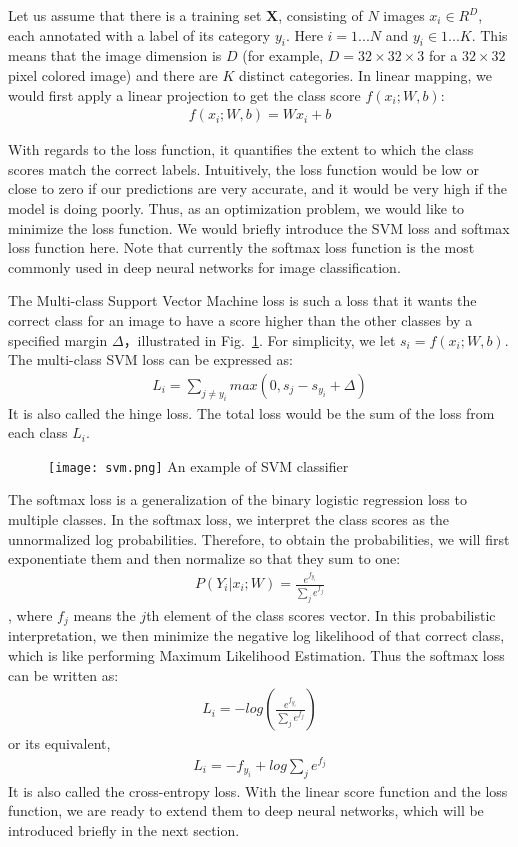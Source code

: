 Let us assume that there is a training set $\mathbf{X}$, consisting of $N$ images $x_i \in R^D$, each annotated with a label of its category $y_i$. Here $i = 1 ...N$ and $y_i \in 1 ... K$. This means that the image dimension is $D$ (for example, $D=32\times32\times3$ for a $32\times32$ pixel colored image) and there are $K$ distinct categories. In linear mapping, we would first apply a linear projection to get the class score $f(x_i; W, b)$:
\begin{align}
f(x_i; W, b) = Wx_i + b
\end{align}

With regards to the loss function, it quantifies the extent to which the class scores match the correct labels. Intuitively, the loss function would be low or close to zero if our predictions are very accurate, and it would be very high if the model is doing poorly. Thus, as an optimization problem, we would like to minimize the loss function. We would briefly introduce the SVM loss and softmax loss function here. Note that currently the softmax loss function is the most commonly used in deep neural networks for image classification.

The Multi-class Support Vector Machine loss is such a loss that it wants the correct class for an image to have a score higher than the other classes by a specified margin $\Delta$，illustrated in Fig.~\ref{fig:svm}. For simplicity, we let $s_i = f(x_i; W, b)$. The multi-class SVM loss can be expressed as:
\begin{align}L_i = \sum_{j\neq y_i} max(0, s_j - s_{y_i} + \Delta)\end{align}
It is also called the hinge loss. The total loss would be the sum of the loss from each class $L_i$.
\begin{figure}[!htp]
	\centering
	\texttt{[image: svm.png]}
	{An example of SVM classifier}
	\label{fig:svm}
\end{figure}
The softmax loss is a generalization of the binary logistic regression loss to multiple classes. In the softmax loss, we interpret the class scores as the unnormalized log probabilities. Therefore, to obtain the probabilities, we will first exponentiate them and then normalize so that they sum to one: 
\begin{align}
P(Y_i|x_i;W) = \frac{e^{f_{y_i}}}{\sum_j e^{f_j}}
\end{align}, where $f_j$ means the $j$th element of the class scores vector.
In this probabilistic interpretation, we then minimize the negative log likelihood of that correct class, which is like performing Maximum Likelihood Estimation. Thus the softmax loss can be written as:
\begin{align}L_i = -log\left( \frac{e^{f_{y_i}}}{\sum_j e^{f_j}}\right)\end{align}
or its equivalent,
\begin{align} L_i = -f_{y_i} + log \sum_j e^{f_j}\end{align}
It is also called the cross-entropy loss. With the linear score function and the loss function, we are ready to extend them to deep neural networks, which will be introduced briefly in the next section.



